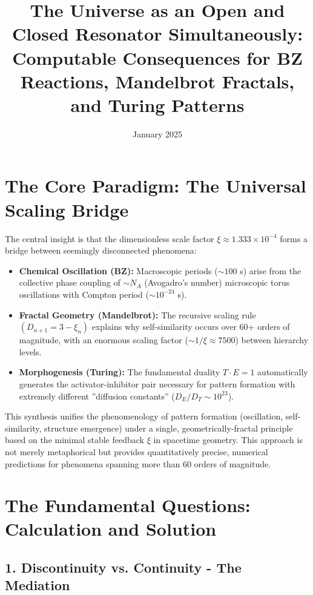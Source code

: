 \documentclass[12pt,a4paper]{article}
\title{The Universe as an Open and Closed Resonator Simultaneously: \\
	Computable Consequences for BZ Reactions, Mandelbrot Fractals, and Turing Patterns}
\author{}
\date{January 2025}
\begin{document}
	
	\maketitle

\tableofcontents
	
	\section*{The Core Paradigm: The Universal Scaling Bridge}
	
	The central insight is that the dimensionless scale factor $\xi \approx 1.333 \times 10^{-4}$ forms a bridge between seemingly disconnected phenomena:
	
	\begin{itemize}[label=$\bullet$]
		\item \textbf{Chemical Oscillation (BZ):} Macroscopic periods ($\sim 100$ s) arise from the collective phase coupling of $\sim N_A$ (Avogadro's number) microscopic torus oscillations with Compton period ($\sim 10^{-24}$ s).
		
		\item \textbf{Fractal Geometry (Mandelbrot):} The recursive scaling rule $(D_{n+1} = 3 - \xi_n)$ explains why self-similarity occurs over 60+ orders of magnitude, with an enormous scaling factor ($\sim 1/\xi \approx 7500$) between hierarchy levels.
		
		\item \textbf{Morphogenesis (Turing):} The fundamental duality $T \cdot E = 1$ automatically generates the activator-inhibitor pair necessary for pattern formation with extremely different ''diffusion constants'' ($D_E/D_T \sim 10^{23}$).
	\end{itemize}
	
	This synthesis unifies the phenomenology of pattern formation (oscillation, self-similarity, structure emergence) under a single, geometrically-fractal principle based on the minimal stable feedback $\xi$ in spacetime geometry. This approach is not merely metaphorical but provides quantitatively precise, numerical predictions for phenomena spanning more than 60 orders of magnitude.
	
	\section*{The Fundamental Questions: Calculation and Solution}
	
	\subsection*{1. Discontinuity vs. Continuity - The Mediation}
	
\end{document}
